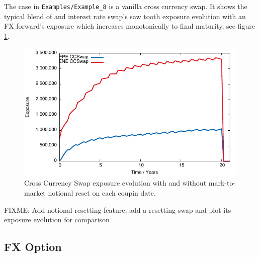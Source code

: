 \documentclass[12pt, a4paper]{article}
\begin{document}
The case in {\tt Examples/Example\_8} is a vanilla cross currency swap. It shows the typical blend of and interest rate swap's saw tooth exposure evolution with an FX forward's exposure which increases monotonically to final maturity, see figure \ref{fig_6}.
\begin{figure}[hbt]
\begin{center}
\includegraphics[scale=1.0]{example_ccswap.pdf}
\end{center}
\caption{Cross Currency Swap exposure evolution with and without mark-to-market notional reset on each coupin date.}
\label{fig_6}
\end{figure}

{\color{red}FIXME: Add notional resetting feature, add a resetting swap and plot its exposure evolution for comparison}

\subsection{FX Option}
\end{document}
